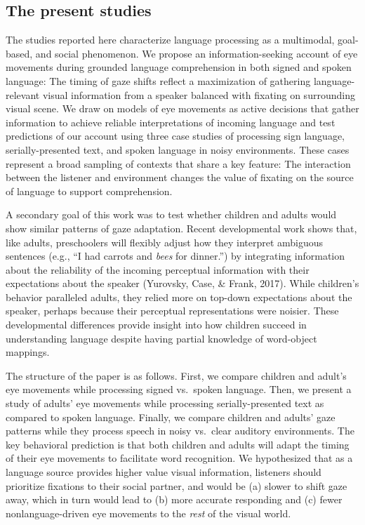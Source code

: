 \documentclass[english,floatsintext,man]{apa6}
\begin{document}
\hypertarget{the-present-studies}{%
\subsection{The present studies}\label{the-present-studies}}

The studies reported here characterize language processing as a
multimodal, goal-based, and social phenomenon. We propose an
information-seeking account of eye movements during grounded language
comprehension in both signed and spoken language: The timing of gaze
shifts reflect a maximization of gathering language-relevant visual
information from a speaker balanced with fixating on surrounding visual
scene. We draw on models of eye movements as active decisions that
gather information to achieve reliable interpretations of incoming
language and test predictions of our account using three case studies of
processing sign language, serially-presented text, and spoken language
in noisy environments. These cases represent a broad sampling of
contexts that share a key feature: The interaction between the listener
and environment changes the value of fixating on the source of language
to support comprehension.

A secondary goal of this work was to test whether children and adults
would show similar patterns of gaze adaptation. Recent developmental
work shows that, like adults, preschoolers will flexibly adjust how they
interpret ambiguous sentences (e.g., \enquote{I had carrots and
\emph{bees} for dinner.}) by integrating information about the
reliability of the incoming perceptual information with their
expectations about the speaker (Yurovsky, Case, \& Frank, 2017). While
children's behavior paralleled adults, they relied more on top-down
expectations about the speaker, perhaps because their perceptual
representations were noisier. These developmental differences provide
insight into how children succeed in understanding language despite
having partial knowledge of word-object mappings.

The structure of the paper is as follows. First, we compare children and
adult's eye movements while processing signed vs.~spoken language. Then,
we present a study of adults' eye movements while processing
serially-presented text as compared to spoken language. Finally, we
compare children and adults' gaze patterns while they process speech in
noisy vs.~clear auditory environments. The key behavioral prediction is
that both children and adults will adapt the timing of their eye
movements to facilitate word recognition. We hypothesized that as a
language source provides higher value visual information, listeners
should prioritize fixations to their social partner, and would be (a)
slower to shift gaze away, which in turn would lead to (b) more accurate
responding and (c) fewer nonlanguage-driven eye movements to the
\emph{rest} of the visual world.
\end{document}

